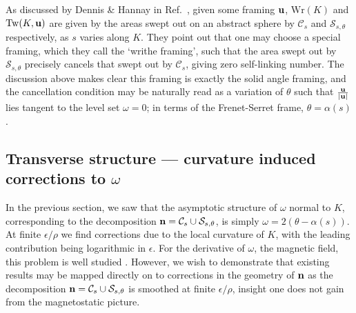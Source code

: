     As discussed by Dennis \& Hannay in Ref.~\citep{Dennis2005}, given some framing ${\bf u}$, $\mathrm{Wr}(K)$ and $\mathrm{Tw}(K, {\bf u})$ are given by the areas swept out on an abstract sphere by $\mathcal{C}_s$ and $\mathcal{S}_{s,\theta}$ respectively, as $s$ varies along $K$. They point out that one may choose a special framing, which they call the `writhe framing', such that the area swept out by $\mathcal{S}_{s,\theta}$ precisely cancels that swept out by $\mathcal{C}_s$, giving zero self-linking number. The discussion above makes clear this framing is exactly the solid angle framing, and the cancellation condition may be naturally read as a variation of $\theta$ such that $\frac{{\bf u}}{|{\bf u}|}$ lies tangent to the level set $\omega = 0$; in terms of the Frenet-Serret frame, $\theta= \alpha(s)$.

    \subsection{Transverse structure --- curvature induced corrections to $\omega$}

    In the previous section, we saw that the asymptotic structure of $\omega$ normal to $K$, corresponding to the decomposition ${\bf n} = \mathcal{C}_s \cup \mathcal{S}_{s,\theta}$, is simply $\omega = 2( \theta - \alpha(s))$. At finite $\epsilon/\rho$ we find corrections due to the local curvature of $K$, with the leading contribution being logarithmic in $\epsilon$. For the derivative of $\omega$, the magnetic field, this problem is well studied \citep{Saffman1992,Ricca1994}. However, we wish to demonstrate that existing results may be mapped directly on to corrections in the geometry of $\bf n$ as the decomposition ${\bf n} = \mathcal{C}_s \cup \mathcal{S}_{s,\theta}$ is smoothed at finite $\epsilon/\rho$, insight one does not gain from the magnetostatic picture.

